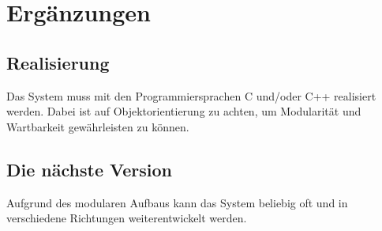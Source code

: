 \chapter{Ergänzungen}
\section{Realisierung}
Das System muss mit den Programmiersprachen C und/oder C++ realisiert werden. Dabei ist auf Objektorientierung zu achten, um Modularität und Wartbarkeit gewährleisten zu können.
\section{Die nächste Version}
Aufgrund des modularen Aufbaus kann das System beliebig oft und in verschiedene Richtungen weiterentwickelt werden.
